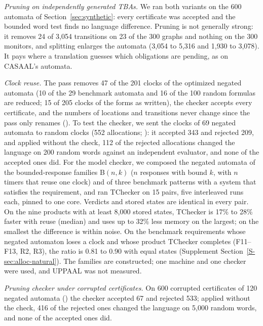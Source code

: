 \emph{Pruning on independently generated TBAs.} We ran both variants on the 600 automata of Section~\ref{sec:synthetic}: every certificate was accepted and the bounded word test finds no language difference. Pruning is not generally strong: it removes 24 of 3{,}054 transitions on 23 of the 300 graphs and nothing on the 300 monitors, and splitting enlarges the automata (3{,}054 to 5{,}316 and 1{,}930 to 3{,}078). It pays where a translation guesses which obligations are pending, as on CASAAL's automata.

\emph{Clock reuse.} The pass removes 47 of the 201 clocks of the optimized negated automata (10 of the 29 benchmark automata and 16 of the 100 random formulas are reduced; 15 of 205 clocks of the forms as written), the checker accepts every certificate, and the numbers of locations and transitions never change since the pass only renames (). To test the checker, we sent the clocks of 69 negated automata to random clocks (552 allocations; ): it accepted 343 and rejected 209, and applied without the check, 112 of the rejected allocations changed the language on 200 random words against an independent evaluator, and none of the accepted ones did. For the model checker, we composed the negated automata of the bounded-response families B$(n,k)$ ($n$ responses with bound $k$, with $n$ timers that reuse one clock) and of three benchmark patterns with a system that satisfies the requirement, and ran TChecker on 15 pairs, five interleaved runs each, pinned to one core. Verdicts and stored states are identical in every pair. On the nine products with at least 8{,}000 stored states, TChecker is 17\% to 28\% faster with reuse (median) and uses up to 32\% less memory on the largest; on the smallest the difference is within noise. On the benchmark requirements whose negated automaton loses a clock and whose product TChecker completes (F11--F13, R2, R3), the ratio is 0.81 to 0.90 with equal states (Supplement Section~\ref{S-sec:alloc-natural}). The families are constructed; one machine and one checker were used, and UPPAAL was not measured.

\emph{Pruning checker under corrupted certificates.} On 600 corrupted certificates of 120 negated automata () the checker accepted 67 and rejected 533; applied without the check, 416 of the rejected ones changed the language on 5{,}000 random words, and none of the accepted ones did.

